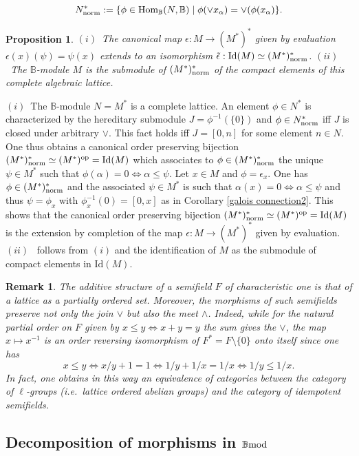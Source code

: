 \documentclass[12pt]{article}
\newtheorem{prop}[thm]{Proposition}
\newtheorem{rem}[thm]{Remark}
\def\Hom{{\rm Hom}}
\def\id{{\rm id}}
\def\B{{\mathbb B}}
\newcommand{\ie}{{\it i.e.\/}\ }
\def\id{{\mbox{Id}}}
\def\Hom {{\mbox{Hom}}}
\def\bmod{{\rm \B mod}}
\begin{document}
$$
N^*_{\rm norm}:=\{\phi\in \Hom_\B(N,\B)\mid \phi(\vee x_\alpha)=\vee(\phi(x_\alpha)\}.
$$
 \begin{prop}\label{bidual} $(i)$~The canonical map $\epsilon: M\to (M^*)^*$ given by evaluation $\epsilon(x)(\psi)=\psi(x)$ extends to an isomorphism $\tilde \epsilon: \id(M)\simeq (M^*)^*_{\rm norm}$. 	\newline
 $(ii)$~The $\B$-module $M$ is the submodule of $(M^*)^*_{\rm norm}$ of the compact elements of this complete algebraic lattice.
 \end{prop}
\proof $(i)$~The $\B$-module $N=M^*$ is a complete lattice. An element $\phi \in N^*$ is characterized by the hereditary submodule $J=\phi^{-1}(\{0\})$ and $\phi\in N^*_{\rm norm}$ iff $J$ is closed under arbitrary $\vee$. This fact holds iff $J=[0,n]$ for some element $n\in N$. One thus obtains a canonical order preserving bijection $(M^*)^*_{\rm norm}\simeq (M^*)^{\rm op}=\id(M)$ which associates to $\phi\in (M^*)^*_{\rm norm}$ the unique $\psi\in M^*$ such that $
\phi(\alpha)=0\iff \alpha\leq \psi
$. 
Let $x\in M$ and $\phi=\epsilon_x$. One has $\phi\in (M^*)^*_{\rm norm}$ and the associated $\psi\in M^*$ is such that $\alpha(x)=0\iff \alpha\leq \psi$ and thus $\psi=\phi_x$ with $\phi_x^{-1}(0)=[0,x]$ as in Corollary \ref{galois connection2}. This shows that the canonical order preserving bijection $(M^*)^*_{\rm norm}\simeq (M^*)^{\rm op}=\id(M)$ is the extension by completion of the  map $\epsilon: M\to (M^*)^*$ given by evaluation.\newline
$(ii)$~ follows from $(i)$ and the identification of $M$ as the submodule of compact elements in $\id(M)$. \endproof 

\begin{rem}\label{lattice implicit}{\rm The additive structure of a semifield $F$ of characteristic one is that of a lattice as a partially ordered set. Moreover, the morphisms of such semifields preserve not only the join $\vee$ but also the meet $\wedge$. Indeed, while for the natural partial order on $F$ given by $x\leq y\iff x+y=y$ the sum gives the $\vee$, the map $x\mapsto x^{-1}$ is an order reversing isomorphism of $F^*=F\setminus \{0\}$ onto itself since one has
$$
x\leq y\iff x/y+1=1\iff 1/y+1/x=1/x\iff 1/y\leq 1/x.
$$ 
In fact, one obtains in this way an equivalence of categories between the category of $\ell$-groups (\ie lattice ordered abelian groups) and the category of idempotent semifields. 	
}\end{rem}


\subsection{Decomposition of morphisms in $\bmod$}\label{sect dec morphisms}
\end{document}
